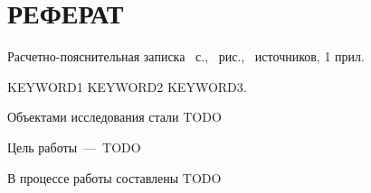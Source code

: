 \chapter*{РЕФЕРАТ}
Расчетно-пояснительная записка \pageref{LastPage}~с., ~рис., ~источников, 1 прил.

KEYWORD1 KEYWORD2 KEYWORD3.

Объектами исследования стали TODO

Цель работы~---~TODO

В процессе работы составлены TODO
